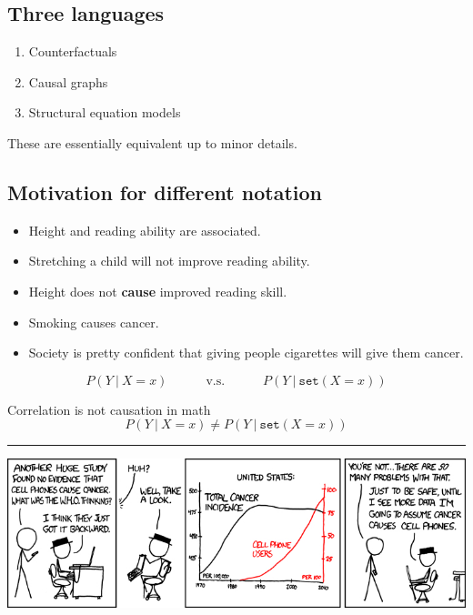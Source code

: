 \documentclass[]{article}
\providecommand{\tightlist}{%
  \setlength{\itemsep}{0pt}\setlength{\parskip}{0pt}}
\begin{document}
\hypertarget{three-languages}{%
\subsection{Three languages}\label{three-languages}}

\begin{enumerate}
\def\labelenumi{\arabic{enumi}.}
\tightlist
\item
  Counterfactuals
\item
  Causal graphs
\item
  Structural equation models
\end{enumerate}

These are essentially equivalent up to minor details.

\hypertarget{motivation-for-different-notation}{%
\subsection{Motivation for different
notation}\label{motivation-for-different-notation}}

\begin{itemize}
\item
  Height and reading ability are associated.
\item
  Stretching a child will not improve reading ability.
\item
  Height does not \textbf{cause} improved reading skill.
\item
  Smoking causes cancer.
\item
  Society is pretty confident that giving people cigarettes will give
  them cancer.
\end{itemize}

\[
P(Y\ \vert\ X=x) \quad\quad\quad \textrm{v.s.} \quad\quad\quad P(Y\ \vert\ \texttt{set}(X=x))
\]

Correlation is not causation in math \[
P(Y\ \vert\ X=x) \neq P(Y\ \vert\ \texttt{set}(X=x))
\]

\begin{center}\rule{0.5\linewidth}{\linethickness}\end{center}

\begin{center}\includegraphics{gfx/cell_phones} \end{center}
\end{document}
